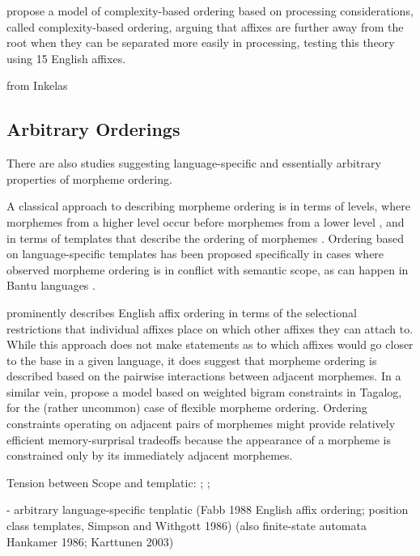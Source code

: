 \documentclass[11pt,letterpaper]{article}
\newcommand{\citep}{\parencite}
\newcommand{\citet}{\Textcite}
\begin{document}
\citet{hay2004what} propose a model of complexity-based ordering based on processing considerations, called complexity-based ordering, arguing that affixes are further away from the root when they can be separated more easily in processing, testing this theory using 15 English affixes.


from Inkelas



\subsection{Arbitrary Orderings}

There are also studies suggesting language-specific and essentially arbitrary properties of morpheme ordering.

A classical approach to describing morpheme ordering is in terms of levels, where morphemes from a higher level occur before morphemes from a lower level \citep{siegel1979topics}, and in terms of templates that describe the ordering of morphemes \citep{simpson1986pronominal,spencer1991morphological,stump1992on,inkelas1993nimboran,hyman2003suffix}.
Ordering based on language-specific templates has been proposed specifically in cases where observed morpheme ordering is in conflict with semantic scope, as can happen in Bantu languages \citep{hyman2003suffix}.



\citet{fabb1988english} prominently describes English affix ordering in terms of the selectional restrictions that individual affixes place on which other affixes they can attach to.
While this approach does not make statements as to which affixes would go closer to the base in a given language, it does suggest that morpheme ordering is described based on the pairwise interactions between adjacent morphemes.
In a similar vein, \citet{ryan2010variable} propose a model based on weighted bigram constraints in Tagalog, for the (rather uncommon) case of flexible morpheme ordering.
Ordering constraints operating on adjacent pairs of morphemes might provide relatively efficient memory-surprisal tradeoffs because the appearance of a morpheme is constrained only by its immediately adjacent morphemes.




Tension between Scope and templatic: \citep{hyman2003suffix}; \cite{aronoff2010introduction}; \cite{spencer2003putting}

- arbitrary language-specific tenplatic (Fabb 1988 English affix ordering; position class templates, Simpson and Withgott 1986) (also finite-state automata Hankamer 1986; Karttunen 2003) 
\end{document}
